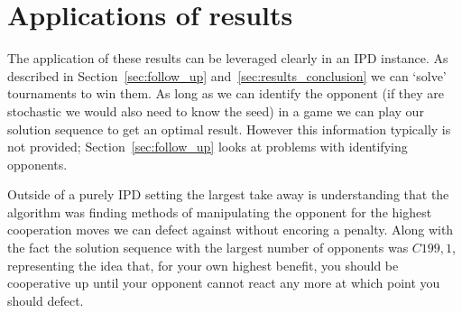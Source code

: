 \section{Applications of results}\label{sec:conclusion_application}
The application of these results can be leveraged clearly in an IPD instance.
As described in Section~\ref{sec:follow_up} and~\ref{sec:results_conclusion} we can `solve' tournaments to win them.
As long as we can identify the opponent (if they are stochastic we would also need to know the seed) in a game we can play our solution sequence to get an optimal result.
However this information typically is not provided; Section~\ref{sec:follow_up} looks at problems with identifying opponents.

Outside of a purely IPD setting the largest take away is understanding that the algorithm was finding methods of manipulating the opponent for the highest cooperation moves we can defect against without encoring a penalty.
Along with the fact the solution sequence with the largest number of opponents was $C199,1$, representing the idea that, for your own highest benefit, you should be cooperative up until your opponent cannot react any more at which point you should defect.

